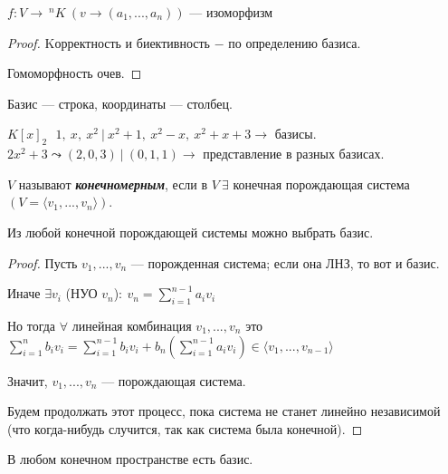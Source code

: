 \begin{statement}
    $f:V\rightarrow\ ^nK\ (v\rightarrow (a_1,...,a_n))$ — изоморфизм
\end{statement}

\begin{proof}
    Kорректность и биективность $-$ по определению базиса. 
    
    Гомоморфность очев.
\end{proof}

\begin{designation}
    Базис — строка, координаты — столбец.
\end{designation}

\begin{example}
    $K[x]_2\ \ \ 1,\ x,\ x^2\ |\ x^2+1,\ x^2-x,\ x^2+x+3 \rightarrow$  
базисы. \\
    $2x^2+3\leadsto(2,0,3)\ |\ (0,1,1)\rightarrow$ представление в разных 
базисах.
    
\end{example}

\begin{definition}
    $V$ называют \textbf{\textit{конечномерным}}, если в $V \ \exists$ 
конечная порождающая система $(V=\langle v_1,...,v_n \rangle)$.
\end{definition}

\begin{lemma}
    Из любой конечной порождающей системы можно выбрать базис.
\end{lemma}

\begin{proof}
    Пусть $v_1,...,v_n$ — порожденная система; если она ЛНЗ, то вот и 
базис.
    
    Иначе $\exists v_i$ (НУО $v_n$)$:\ v_n=\sum\limits_{i=1}^{n-1}a_iv_i$
    
    Но тогда $\forall$  линейная комбинация $v_1,...,v_n$ это 
$\sum\limits_{i=1}^{n}b_iv_i=\sum\limits_{i=1}^{n-1}b_iv_i+b_n(\sum\limits_{i=1}^{n-1}a_iv_i)\in 
\langle v_1,...,v_{n-1} \rangle$ 
    
    Значит, $v_1,...,v_n$ — порождающая система. 
    
    Будем продолжать этот процесс, пока система не станет линейно 
независимой (что когда-нибудь случится, так как система была конечной).
\end{proof}

\begin{corollary}
    В любом конечном пространстве есть базис.
\end{corollary}

